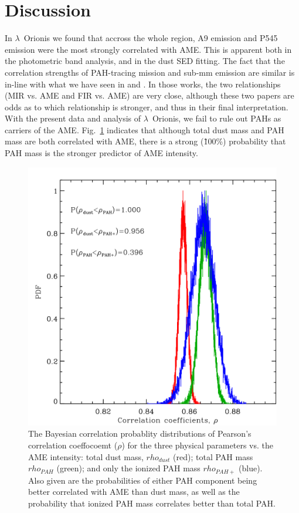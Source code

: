  \section{Discussion}
      In  $\lambda$~Orionis we found that accross the whole region, A9 emission and P545 emission were the most strongly correlated with AME. This is apparent both in the photometric band analysis, and in the dust SED fitting.  The fact that the correlation strengths of PAH-tracing mission and sub-mm emission are similar is in-line with what we have seen in \cite{ysard10b} and \cite{hensley16}. In those works, the two relationships (MIR vs. AME and FIR vs. AME) are very close, although these two papers are odds as to which relationship is stronger, and thus in their final interpretation. With the present data and analysis of $\lambda$~Orionis, we fail to rule out PAHs as carriers of the AME. Fig.~\ref{fig:fred_LOri_notes_Oct2017_fig2c} indicates that although total dust mass and PAH mass are both correlated with AME, there is a strong (\~100\%) probability that PAH mass is the stronger predictor of AME intensity.
          \begin{figure}
            \includegraphics[width=\textwidth/2]{../Plots/ch_lori/fred_LOri_notes_Oct2017_fig2c.pdf}
            \centering
            \caption{ The Bayesian correlation probablity distributions of Pearson's correlation coeffocoemt ($\rho{}$) for the three physical parameters vs. the AME intensity: total dust mass, $rho_{dust}$ (red); total PAH mass $rho_{PAH}$ (green); and only the ionized PAH mass $rho_{PAH+}$ (blue). Also given are the probabilities of either PAH component being better correlated with AME than dust mass, as well as the probability that ionized PAH mass correlates better than total PAH.}
            \label{fig:fred_LOri_notes_Oct2017_fig2c}
          \end{figure}
